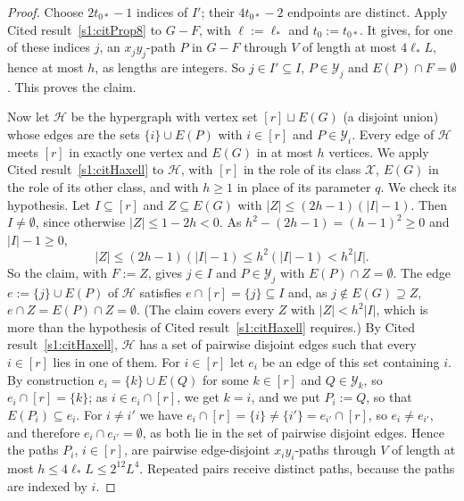\begin{proof}
Choose $2t_{0*}-1$ indices of $I'$; their $4t_{0*}-2$ endpoints are
distinct. Apply Cited result~\ref{s1:citProp8} to $G-F$, with $\ell:=\ell_*$
and $t_0:=t_{0*}$. It gives, for one of these indices $j$, an
$x_jy_j$-path $P$ in $G-F$ through $V$ of length at most $4\ell_*L$, hence
at most $h$, as lengths are integers. So $j\in I'\subseteq I$,
$P\in\mathcal Y_j$ and $E(P)\cap F=\emptyset$. This proves the claim.

Now let $\mathcal H$ be the hypergraph with vertex set $[r]\sqcup E(G)$ (a
disjoint union) whose edges are the sets $\{i\}\cup E(P)$ with $i\in[r]$
and $P\in\mathcal Y_i$. Every edge of $\mathcal H$ meets $[r]$ in exactly
one vertex and $E(G)$ in at most $h$ vertices. We apply Cited
result~\ref{s1:citHaxell} to $\mathcal H$, with $[r]$ in the role of its
class $\mathcal X$, $E(G)$ in the role of its other class, and with $h\ge1$ in
place of its parameter $q$. We check its hypothesis. Let $I\subseteq[r]$ and $Z\subseteq E(G)$
with $|Z|\le(2h-1)(|I|-1)$. Then $I\ne\emptyset$, since otherwise
$|Z|\le1-2h<0$. As $h^2-(2h-1)=(h-1)^2\ge0$ and $|I|-1\ge0$,
\[
|Z|\le(2h-1)(|I|-1)\le h^2(|I|-1)<h^2|I| .
\]
So the claim, with $F:=Z$, gives $j\in I$ and $P\in\mathcal Y_j$ with
$E(P)\cap Z=\emptyset$. The edge $e:=\{j\}\cup E(P)$ of $\mathcal H$
satisfies $e\cap[r]=\{j\}\subseteq I$ and, as $j\notin E(G)\supseteq Z$,
$e\cap Z=E(P)\cap Z=\emptyset$. (The claim covers every $Z$ with
$|Z|<h^2|I|$, which is more than the hypothesis of Cited
result~\ref{s1:citHaxell} requires.) By Cited result~\ref{s1:citHaxell},
$\mathcal H$ has a set of pairwise disjoint edges such that every
$i\in[r]$ lies in one of them. For $i\in[r]$ let $e_i$ be an edge of this
set containing $i$. By construction $e_i=\{k\}\cup E(Q)$ for some
$k\in[r]$ and $Q\in\mathcal Y_k$, so $e_i\cap[r]=\{k\}$; as
$i\in e_i\cap[r]$, we get $k=i$, and we put $P_i:=Q$, so that
$E(P_i)\subseteq e_i$. For $i\ne i'$ we have
$e_i\cap[r]=\{i\}\ne\{i'\}=e_{i'}\cap[r]$, so $e_i\ne e_{i'}$, and
therefore $e_i\cap e_{i'}=\emptyset$, as both lie in the set of pairwise
disjoint edges. Hence the paths $P_i$, $i\in[r]$, are pairwise
edge-disjoint $x_iy_i$-paths through $V$ of length at most
$h\le4\ell_*L\le2^{12}L^4$. Repeated pairs receive distinct paths,
because the paths are indexed by $i$.
\end{proof}

